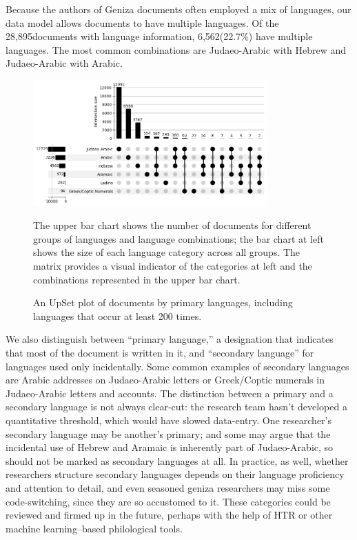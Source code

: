 \documentclass{article}
\def\documentsAnyLang{28,895}
\def\documentsMultiLang{6,562}
\def\percentDocsMultiLang{22.7\%}
\begin{document}
Because the authors of Geniza documents often employed a mix of languages, our data model allows documents to have multiple languages. Of the \documentsAnyLang documents with language information, \documentsMultiLang (\percentDocsMultiLang) have multiple languages. The most common combinations are Judaeo-Arabic with Hebrew and Judaeo-Arabic with Arabic. 

\begin{figure}[!hbt]
  \centering
  \includegraphics[width=0.8\textwidth]{charts/primary_language_upsetplot.png}
  \caption{An UpSet plot of documents by primary languages, including languages that occur at least 200 times.}
    \medskip
    \small
    The upper bar chart shows the number of documents for different groups of languages and language combinations; the bar chart at left shows the size of each language category across all groups. The matrix provides a visual indicator of the categories at left and the combinations represented in the upper bar chart.\footnotemark
  \label{fig:lang_combination_upset_plot}
\end{figure}


We also distinguish between “primary language,” a designation that indicates that most of the document is written in it, and “secondary language” for languages used only incidentally. Some common examples of secondary languages are Arabic addresses on Judaeo-Arabic letters or Greek/Coptic numerals in Judaeo-Arabic letters and accounts. The distinction between a primary and a secondary language is not always clear-cut: the research team hasn't developed a quantitative threshold, which would have slowed data-entry. One researcher's secondary language may be another's primary; and some may argue that the incidental use of Hebrew and Aramaic is inherently part of Judaeo-Arabic, so should not be marked as secondary languages at all. In practice, as well, whether researchers structure secondary languages depends on their language proficiency and attention to detail, and even seasoned geniza researchers may miss some code-switching, since they are so accustomed to it. These categories could be reviewed and firmed up in the future, perhaps with the help of HTR or other machine learning–based philological tools.
\end{document}
